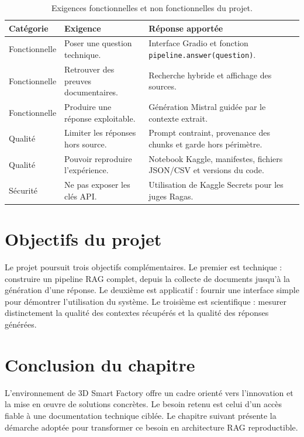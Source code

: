 \documentclass[12pt,a4paper,oneside]{report}
\begin{document}
\begin{table}[H]
\centering
\caption{Exigences fonctionnelles et non fonctionnelles du projet.}
\label{tab:exigences}
\begin{tabularx}{\textwidth}{p{3.5cm}Y Y}
\toprule
\textbf{Catégorie} & \textbf{Exigence} & \textbf{Réponse apportée}\\
\midrule
Fonctionnelle & Poser une question technique. & Interface Gradio et fonction \texttt{pipeline.answer(question)}.\\
Fonctionnelle & Retrouver des preuves documentaires. & Recherche hybride et affichage des sources.\\
Fonctionnelle & Produire une réponse exploitable. & Génération Mistral guidée par le contexte extrait.\\
Qualité & Limiter les réponses hors source. & Prompt contraint, provenance des chunks et garde hors périmètre.\\
Qualité & Pouvoir reproduire l'expérience. & Notebook Kaggle, manifestes, fichiers JSON/CSV et versions du code.\\
Sécurité & Ne pas exposer les clés API. & Utilisation de Kaggle Secrets pour les juges Ragas.\\
\bottomrule
\end{tabularx}
\end{table}

\section{Objectifs du projet}

Le projet poursuit trois objectifs complémentaires. Le premier est technique :
construire un pipeline RAG complet, depuis la collecte de documents jusqu'à la
génération d'une réponse. Le deuxième est applicatif : fournir une interface
simple pour démontrer l'utilisation du système. Le troisième est scientifique :
mesurer distinctement la qualité des contextes récupérés et la qualité des
réponses générées.

\section*{Conclusion du chapitre}

L'environnement de 3D Smart Factory offre un cadre orienté vers l'innovation et
la mise en œuvre de solutions concrètes. Le besoin retenu est celui d'un accès
fiable à une documentation technique ciblée. Le chapitre suivant présente la
démarche adoptée pour transformer ce besoin en architecture RAG reproductible.
\end{document}
